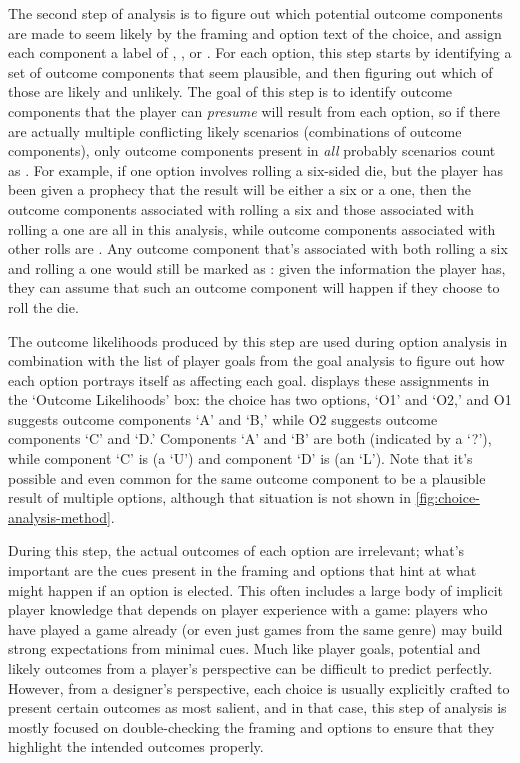 \label{sec:cp-likelihood-analysis}

The second step of analysis is to figure out which potential outcome components are made to seem likely by the framing and option text of the choice, and assign each component a label of , , or .
%
For each option, this step starts by identifying a set of outcome components that seem plausible, and then figuring out which of those are likely and unlikely.
%
The goal of this step is to identify outcome components that the player can \emph{presume} will result from each option, so if there are actually multiple conflicting likely scenarios (combinations of outcome components), only outcome components present in \emph{all} probably scenarios count as .
%
For example, if one option involves rolling a six-sided die, but the player has been given a prophecy that the result will be either a six or a one, then the outcome components associated with rolling a six and those associated with rolling a one are all  in this analysis, while outcome components associated with other rolls are . 
%
Any outcome component that's associated with both rolling a six and rolling a one would still be marked as : given the information the player has, they can assume that such an outcome component will happen if they choose to roll the die.


The outcome likelihoods produced by this step are used during option analysis in combination with the list of player goals from the goal analysis to figure out how each option portrays itself as affecting each goal.
%
 displays these assignments in the `Outcome Likelihoods' box: the choice has two options, `O1' and `O2,' and O1 suggests outcome components `A' and `B,' while O2 suggests outcome components `C' and `D.'
%
Components `A' and `B' are both  (indicated by a `?'), while component `C' is  (a `U') and component `D' is  (an `L').
%
Note that it's possible and even common for the same outcome component to be a plausible result of multiple options, although that situation is not shown in \cref{fig:choice-analysis-method}.


During this step, the actual outcomes of each option are irrelevant; what's important are the cues present in the framing and options that hint at what might happen if an option is elected.
%
This often includes a large body of implicit player knowledge that depends on player experience with a game: players who have played a game already (or even just games from the same genre) may build strong expectations from minimal cues.
%
Much like player goals, potential and likely outcomes from a player's perspective can be difficult to predict perfectly.
%
However, from a designer's perspective, each choice is usually explicitly crafted to present certain outcomes as most salient, and in that case, this step of analysis is mostly focused on double-checking the framing and options to ensure that they highlight the intended outcomes properly.


